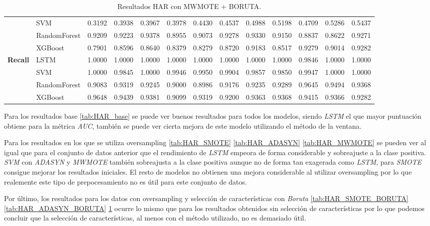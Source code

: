 \begin{table}[h]
\begin{adjustbox}{max width=15cm}
\begin{tabular}{|c|l|r|r|r|r|r|r|r|r|r|r|r|}
			& SVM &  0.3192 &  0.3938 &  0.3967 &  0.3978 &  0.4430 &  0.4537 &  0.4988 &  0.5198 &  0.4709 &  0.5286 &  0.5437 \\
			& RandomForest &  0.9209 &  0.9223 &  0.9378 &  0.8955 &  0.9073 &  0.9278 &  0.9330 &  0.9150 &  0.8837 &  0.8622 &  0.9271 \\
			& XGBoost &  0.7901 &  0.8596 &  0.8640 &  0.8379 &  0.8279 &  0.8720 &  0.9183 &  0.8517 &  0.9279 &  0.9014 &  0.9282 \\
			\hline
			\textbf{Recall} & LSTM &  1.0000 &  1.0000 &  1.0000 &  1.0000 &  1.0000 &  1.0000 &  1.0000 &  1.0000 &  0.9846 &  1.0000 &  1.0000 \\
			& SVM &  1.0000 &  0.9845 &  1.0000 &  0.9946 &  0.9950 &  0.9904 &  0.9857 &  0.9850 &  0.9947 &  1.0000 &  1.0000 \\
			& RandomForest &  0.9083 &  0.9319 &  0.9245 &  0.9000 &  0.8986 &  0.9176 &  0.9235 &  0.9289 &  0.9645 &  0.9494 &  0.9368 \\
			& XGBoost &  0.9648 &  0.9439 &  0.9381 &  0.9099 &  0.9319 &  0.9200 &  0.9363 &  0.9368 &  0.9415 &  0.9366 &  0.9282 \\
			\hline
		\end{tabular}
	\end{adjustbox}
	\caption{Resultados HAR con MWMOTE + BORUTA.}
	\label{tab:HAR_MWMOTE_BORUTA}
\end{table}

\newpage
Para los resultados base \ref{tab:HAR_base} se puede ver buenos resultados para todos los modelos, siendo \textit{LSTM} el que mayor puntuación obtiene para la métrica \textit{AUC}, también se puede ver cierta mejora de este modelo utilizando el método de la ventana.\newline

Para los resultados en los que se utiliza oversampling \ref{tab:HAR_SMOTE} \ref{tab:HAR_ADASYN} \ref{tab:HAR_MWMOTE} se pueden ver al igual que para el conjunto de datos anterior que el rendimiento de \textit{LSTM} empeora de forma considerable y sobreajuste a la clase positiva. \textit{SVM} con \textit{ADASYN} y \textit{MWMOTE} también sobreajusta a la clase positiva aunque no de forma tan exagerada como \textit{LSTM}, para \textit{SMOTE} consigue mejorar los resultados iniciales. El resto de modelos no obtienen una mejora considerable al utilizar oversampling por lo que realemente este tipo de prepocesamiento no es útil para este conjunto de datos.\newline

Por último, los resultados para los datos con oversampling y selección de características con \textit{Boruta} \ref{tab:HAR_SMOTE_BORUTA} \ref{tab:HAR_ADASYN_BORUTA} \ref{tab:HAR_MWMOTE_BORUTA} ocurre lo mismo que para los resultados obtenidos sin selección de características por lo que podemos concluir que la selección de características, al menos con el método utilizado, no es demasiado útil.

